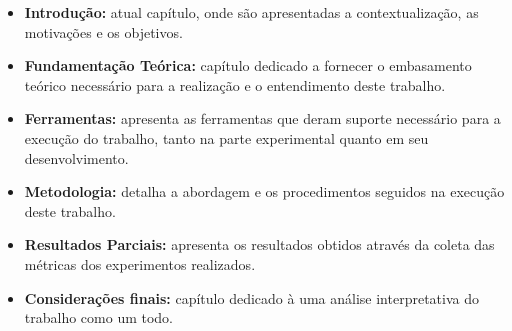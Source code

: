 \begin{itemize}
\item \textbf{Introdução:} atual capítulo, onde são apresentadas a contextualização, as motivações e os objetivos. 
\item \textbf{Fundamentação Teórica:} capítulo dedicado a fornecer o embasamento teórico necessário para a realização e o entendimento deste trabalho.
\item \textbf{Ferramentas:} apresenta as ferramentas que deram suporte necessário para a execução do trabalho, tanto na parte experimental quanto em seu desenvolvimento.
\item \textbf{Metodologia:} detalha a abordagem e os procedimentos seguidos na execução deste trabalho.
\item \textbf{Resultados Parciais:} apresenta os resultados obtidos através da coleta das métricas dos experimentos realizados.
\item \textbf{Considerações finais:} capítulo dedicado à uma análise interpretativa do trabalho como um todo.
\end{itemize}
